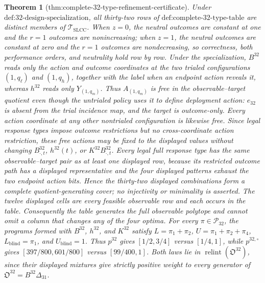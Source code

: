 \documentclass{article}
\newtheorem{theorem}{Theorem}
\begin{document}
\begin{theorem}[thm:complete-32-type-refinement-certificate]\label{thm:complete-32-type-refinement-certificate}
Under \(\text{def:32-design-specialization}\), all thirty-two rows of \(\text{def:complete-32-type-table}\) are distinct members of \(\mathcal T_{\mathrm{SLCC}}\). When \(z=0\), the neutral outcomes are constant at one and the \(r=1\) outcomes are nonincreasing; when \(z=1\), the neutral outcomes are constant at zero and the \(r=1\) outcomes are nondecreasing, so correctness, both performance orders, and neutrality hold row by row. Under the specialization, \(B^{32}\) reads only the action and outcome coordinates at the two trialed configurations \((1,q_{\ell})\) and \((1,q_h)\), together with the label when an endpoint action reveals it, whereas \(h^{32}\) reads only \(Y_{(1,q_m)}\). Thus \(A_{(1,q_m)}\) is free in the observable--target quotient even though the untrialed policy uses it to define deployment action: \(e_{32}\) is absent from the trial incidence map, and the target is outcome-only. Every action coordinate at any other nontrialed configuration is likewise free. Since legal response types impose outcome restrictions but no cross-coordinate action restriction, these free actions may be fixed to the displayed values without changing \(B^{32}_{\cdot,t}\), \(h^{32}(t)\), or \(K^{32}B^{32}_{\cdot,t}\). Every legal full response type has the same observable--target pair as at least one displayed row, because its restricted outcome path has a displayed representative and the four displayed patterns exhaust the two endpoint action bits. Hence the thirty-two displayed combinations form a complete quotient-generating cover; no injectivity or minimality is asserted. The twelve displayed cells are every feasible observable row and each occurs in the table. Consequently the table generates the full observable polytope and cannot omit a column that changes any of the four optima. For every \(\pi\in\mathcal P_{32}\), the programs formed with \(B^{32}\), \(h^{32}\), and \(K^{32}\) satisfy \(L=\pi_1+\pi_2\), \(U=\pi_1+\pi_2+\pi_4\), \(L_{\mathrm{blind}}=\pi_1\), and \(U_{\mathrm{blind}}=1\). Thus \(p^{32}\) gives \([1/2,3/4]\) versus \([1/4,1]\), while \(p^{32,\circ}\) gives \([397/800,601/800]\) versus \([99/400,1]\). Both laws lie in \(\operatorname{relint}(\mathfrak O^{32})\), since their displayed mixtures give strictly positive weight to every generator of \(\mathfrak O^{32}=B^{32}\Delta_{31}\).
\end{theorem}
\end{document}
